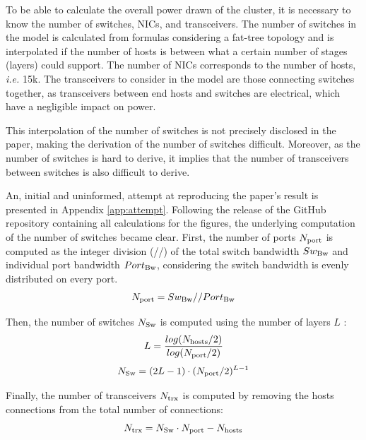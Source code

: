 To be able to calculate the overall power drawn of the cluster, it is necessary to know the number of switches, NICs, and transceivers.
The number of switches in the model is calculated from formulas \cite{Demy} considering a fat-tree topology and is interpolated if the number of hosts is between what a certain number of stages (layers) could support.
The number of NICs corresponds to the number of hosts, \textit{i.e.} 15k.
The transceivers to consider in the model are those connecting switches together, as transceivers between end hosts and switches are electrical, which have a negligible impact on power. 


This interpolation of the number of switches is not precisely disclosed in the paper, making the derivation of the number of switches difficult.
Moreover, as the number of switches is hard to derive, it implies that the number of transceivers between switches is also difficult to derive.

An, initial and uninformed, attempt at reproducing the paper's result is presented in Appendix \ref{app:attempt}. 
Following the release of the GitHub repository containing all calculations for the figures, the underlying computation of the number of switches became clear.
First, the number of ports $N_\textnormal{port}$  is computed as the integer division (//) of the total switch bandwidth $Sw_\textnormal{Bw}$ and individual port bandwidth $Port_\textnormal{Bw}$, considering the switch bandwidth is evenly distributed on every port.
\begin{equation}
	N_\textnormal{port} = Sw_\textnormal{Bw} // Port_\textnormal{Bw}
\end{equation}

Then, the number of switches $N_\textnormal{Sw}$ is computed using the number of layers $L$ :
\begin{equation}
L = \frac{log(N_\textnormal{hosts}/2)}{log(N_\textnormal{port}/2)}
\end{equation}
\begin{equation}
N_\textnormal{Sw} = (2L - 1) \cdot (N_\textnormal{port}/2)^{L-1}
\end{equation}

Finally, the number of transceivers $N_\textnormal{trx}$ is computed by removing the hosts connections from the total number of connections:
\begin{equation}
N_\textnormal{trx} = N_\textnormal{Sw} \cdot N_\textnormal{port} - N_\textnormal{hosts}
\end{equation}


